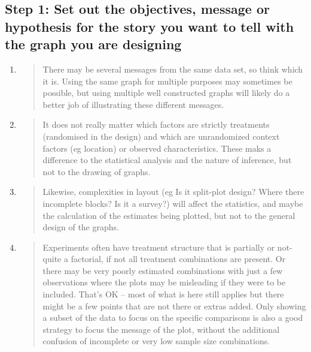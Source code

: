 \documentclass[
]{book}
\begin{document}
\hypertarget{step-1-set-out-the-objectives-message-or-hypothesis-for-the-story-you-want-to-tell-with-the-graph-you-are-designing}{%
\subsection{Step 1: Set out the objectives, message or hypothesis for the story you want to tell with the graph you are designing}\label{step-1-set-out-the-objectives-message-or-hypothesis-for-the-story-you-want-to-tell-with-the-graph-you-are-designing}}

\begin{enumerate}
\def\labelenumi{\alph{enumi}.}
\item
  \begin{quote}
  There may be several messages from the same data set, so think which it is. Using the same graph for multiple purposes may sometimes be possible, but using multiple well constructed graphs will likely do a better job of illustrating these different messages.
  \end{quote}
\item
  \begin{quote}
  It does not really matter which factors are strictly treatments (randomised in the design) and which are unrandomized context factors (eg location) or observed characteristics. These maks a difference to the statistical analysis and the nature of inference, but not to the drawing of graphs.
  \end{quote}
\item
  \begin{quote}
  Likewise, complexities in layout (eg Is it split-plot design? Where there incomplete blocks? Is it a survey?) will affect the statistics, and maybe the calculation of the estimates being plotted, but not to the general design of the graphs.
  \end{quote}
\item
  \begin{quote}
  Experiments often have treatment structure that is partially or not-quite a factorial, if not all treatment combinations are present. Or there may be very poorly estimated combinations with just a few observations where the plots may be misleading if they were to be included. That's OK -- most of what is here still applies but there might be a few points that are not there or extras added. Only showing a subset of the data to focus on the specific comparisons is also a good strategy to focus the message of the plot, without the additional confusion of incomplete or very low sample size combinations.
  \end{quote}
\end{enumerate}
\end{document}
